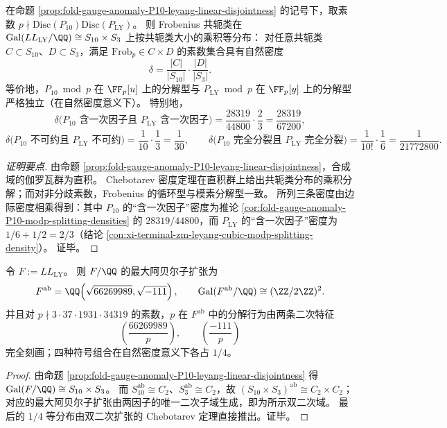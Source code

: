 \begin{corollary}\label{cor:fold-gauge-anomaly-P10-leyang-chebotarev-product-law}
在命题 \ref{prop:fold-gauge-anomaly-P10-leyang-linear-disjointness} 的记号下，取素数 \(p\nmid \mathrm{Disc}(P_{10})\mathrm{Disc}(P_{\mathrm{LY}})\)。
则 Frobenius 共轭类在
\(
\mathrm{Gal}(LL_{\mathrm{LY}}/\QQ)\cong S_{10}\times S_{3}
\)
上按共轭类大小的乘积等分布：
对任意共轭类 \(C\subset S_{10}\)、\(D\subset S_{3}\)，满足 \(\mathrm{Frob}_p\in C\times D\) 的素数集合具有自然密度
\[
\delta=\frac{|C|}{|S_{10}|}\cdot\frac{|D|}{|S_{3}|}.
\]
等价地，\(P_{10}\bmod p\) 在 \(\FF_p[u]\) 上的分解型与 \(P_{\mathrm{LY}}\bmod p\) 在 \(\FF_p[y]\) 上的分解型严格独立（在自然密度意义下）。
特别地，
\[
\delta\bigl(\text{$P_{10}$ 含一次因子且 $P_{\mathrm{LY}}$ 含一次因子}\bigr)
=\frac{28319}{44800}\cdot\frac{2}{3}
=\frac{28319}{67200},
\]
\[
\delta\bigl(\text{$P_{10}$ 不可约且 $P_{\mathrm{LY}}$ 不可约}\bigr)
=\frac{1}{10}\cdot\frac{1}{3}
=\frac{1}{30},
\qquad
\delta\bigl(\text{$P_{10}$ 完全分裂且 $P_{\mathrm{LY}}$ 完全分裂}\bigr)
=\frac{1}{10!}\cdot\frac{1}{6}
=\frac{1}{21772800}.
\]
\end{corollary}
\begin{proof}[证明要点]
由命题 \ref{prop:fold-gauge-anomaly-P10-leyang-linear-disjointness}，合成域的伽罗瓦群为直积。
Chebotarev 密度定理在直积群上给出共轭类分布的乘积分解；而对非分歧素数，Frobenius 的循环型与模素分解型一致。
所列三条密度由边际密度相乘得到：其中 \(P_{10}\) 的“含一次因子”密度为推论 \ref{cor:fold-gauge-anomaly-P10-modp-splitting-densities} 的 \(28319/44800\)，而 \(P_{\mathrm{LY}}\) 的“含一次因子”密度为 \(1/6+1/2=2/3\)（结论 \ref{con:xi-terminal-zm-leyang-cubic-modp-splitting-density}）。
证毕。
\end{proof}

\begin{corollary}\label{cor:fold-gauge-anomaly-P10-leyang-max-abelian-subextension}
令 \(F:=LL_{\mathrm{LY}}\)。
则 \(F/\QQ\) 的最大阿贝尔子扩张为
\[
F^{\mathrm{ab}}
=\QQ\!\left(\sqrt{66269989},\sqrt{-111}\right),
\qquad
\mathrm{Gal}(F^{\mathrm{ab}}/\QQ)\cong (\ZZ/2\ZZ)^2.
\]
并且对 \(p\nmid 3\cdot 37\cdot 1931\cdot 34319\) 的素数，\(p\) 在 \(F^{\mathrm{ab}}\) 中的分解行为由两条二次特征
\[
\left(\frac{66269989}{p}\right),\qquad \left(\frac{-111}{p}\right)
\]
完全刻画；四种符号组合在自然密度意义下各占 \(1/4\)。
\end{corollary}
\begin{proof}
由命题 \ref{prop:fold-gauge-anomaly-P10-leyang-linear-disjointness} 得 \(\mathrm{Gal}(F/\QQ)\cong S_{10}\times S_3\)。
而 \(S_{10}^{\mathrm{ab}}\cong C_2\)、\(S_3^{\mathrm{ab}}\cong C_2\)，故
\(
(S_{10}\times S_3)^{\mathrm{ab}}\cong C_2\times C_2
\)；
对应的最大阿贝尔子扩张由两因子的唯一二次子域生成，即为所示双二次域。
最后的 \(1/4\) 等分布由双二次扩张的 Chebotarev 定理直接推出。证毕。
\end{proof}

